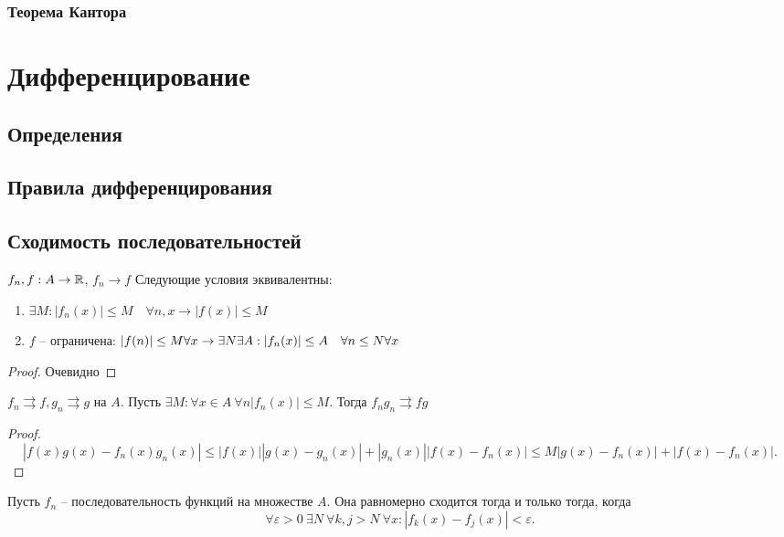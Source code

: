 \documentclass[11pt]{book}
\begin{document}
\subsection{Теорема Кантора}
\chapter{Дифференцирование}
\section{Определения}
\section{Правила дифференцирования}
\section{Сходимость последовательностей}
\begin{thm}
    $f_n, f : A \to  \mathbb{R}$, $f_n \to  f$
    Следующие условия эквивалентны:
    \begin{enumerate}
	\item $\exists M : |f_n(x)| \le  M \quad \forall  n, x \longrightarrow |f(x)| \le  M$
	\item $f$ -- ограничена: $|f(n)| \le  M \forall  x \to \exists  N \exists  A: \\
	    |f_n(x)| \le A \quad \forall  n \le  N \forall  x$
    \end{enumerate}
\end{thm}
\begin{proof}
    Очевидно
\end{proof}
\begin{thm}
    $f_n \rightrightarrows  f, g_n \rightrightarrows  g$ на $A$.
    Пусть $\exists M: \forall x \in A ~\forall  n |f_n(x) | \le  M$. Тогда  $f_n g_n \rightrightarrows fg$
\end{thm}
\begin{proof}
    \[
	|f(x) g(x) - f_n(x) g_n(x)| \le  |f(x) ||g(x) - g_n(x) | + | g_n(x)| |f(x) - f_n(x)| \le  M | g(x) - f_n(x)  |+ | f(x) - f_n(x)|
    .\]
\end{proof}
\begin{thm}
    Пусть $f_n$ -- последовательность функций на множестве $A$. Она равномерно сходится  тогда и только тогда, когда  
    \[
	\forall  \varepsilon >0~ \exists  N ~ \forall  k, j> N~ \forall x : |f_k(x) - f_j(x)| < \varepsilon 
    .\] \label{usl}
\end{thm}
\end{document}
